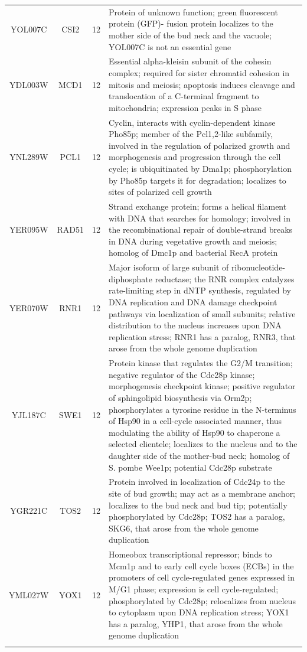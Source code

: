 \documentclass[]{article}
\begin{document}
\begin{longtable}{@{\extracolsep{3pt}} cccp{85mm}}
YOL007C & CSI2 & 12 & Protein of unknown function; green fluorescent protein (GFP)- fusion protein localizes to the mother side of the bud neck and the vacuole; YOL007C is not an essential gene \\ 
YDL003W & MCD1 & 12 & Essential alpha-kleisin subunit of the cohesin complex; required for sister chromatid cohesion in mitosis and meiosis; apoptosis induces cleavage and translocation of a C-terminal fragment to mitochondria; expression peaks in S phase \\ 
YNL289W & PCL1 & 12 & Cyclin, interacts with cyclin-dependent kinase Pho85p; member of the Pcl1,2-like subfamily, involved in the regulation of polarized growth and morphogenesis and progression through the cell cycle; is ubiquitinated by Dma1p; phosphorylation by Pho85p targets it for degradation; localizes to sites of polarized cell growth \\ 
YER095W & RAD51 & 12 & Strand exchange protein; forms a helical filament with DNA that searches for homology; involved in the recombinational repair of double-strand breaks in DNA during vegetative growth and meiosis; homolog of Dmc1p and bacterial RecA protein \\ 
YER070W & RNR1 & 12 & Major isoform of large subunit of ribonucleotide-diphosphate reductase; the RNR complex catalyzes rate-limiting step in dNTP synthesis, regulated by DNA replication and DNA damage checkpoint pathways via localization of small subunits; relative distribution to the nucleus increases upon DNA replication stress; RNR1 has a paralog, RNR3, that arose from the whole genome duplication \\ 
YJL187C & SWE1 & 12 & Protein kinase that regulates the G2/M transition; negative regulator of the Cdc28p kinase; morphogenesis checkpoint kinase; positive regulator of sphingolipid biosynthesis via Orm2p; phosphorylates a tyrosine residue in the N-terminus of Hsp90 in a cell-cycle associated manner, thus modulating the ability of Hsp90 to chaperone a selected clientele; localizes to the nucleus and to the daughter side of the mother-bud neck; homolog of S. pombe Wee1p; potential Cdc28p substrate \\ 
YGR221C & TOS2 & 12 & Protein involved in localization of Cdc24p to the site of bud growth; may act as a membrane anchor; localizes to the bud neck and bud tip; potentially phosphorylated by Cdc28p; TOS2 has a paralog, SKG6, that arose from the whole genome duplication \\ 
YML027W & YOX1 & 12 & Homeobox transcriptional repressor; binds to Mcm1p and to early cell cycle boxes (ECBs) in the promoters of cell cycle-regulated genes expressed in M/G1 phase; expression is cell cycle-regulated; phosphorylated by Cdc28p; relocalizes from nucleus to cytoplasm upon DNA replication stress; YOX1 has a paralog, YHP1, that arose from the whole genome duplication \\   \hline \\ [-1.8ex] 

\end{longtable}
\end{document}
